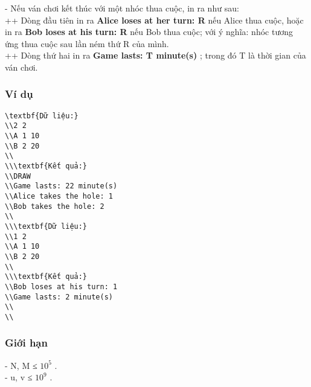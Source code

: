    - Nếu ván chơi kết thúc với một nhóc thua cuộc, in ra như sau:   
\\   ++ Dòng đầu tiên in ra   \textbf{    Alice loses at her turn: R   }   nếu Alice thua cuộc, hoặc in ra   \textbf{    Bob loses at his turn: R   }   nếu Bob thua cuộc; với ý nghĩa: nhóc tương ứng thua cuộc sau lần ném thứ R của mình.   
\\   ++ Dòng thứ hai in ra   \textbf{    Game lasts: T minute(s)   }   ; trong đó T là thời gian của ván chơi.  

\subsubsection{   Ví dụ  }
\begin{verbatim}
\textbf{Dữ liệu:}
\\2 2
\\A 1 10
\\B 2 20
\\
\\\textbf{Kết quả:}
\\DRAW
\\Game lasts: 22 minute(s)
\\Alice takes the hole: 1
\\Bob takes the hole: 2
\\
\\\textbf{Dữ liệu:}
\\1 2
\\A 1 10
\\B 2 20
\\
\\\textbf{Kết quả:}
\\Bob loses at his turn: 1
\\Game lasts: 2 minute(s)
\\
\\\end{verbatim}

\subsubsection{   Giới hạn  }

   - N, M ≤ $10^{5}$   .   
\\   - u, v ≤ $10^{9}$   .  

